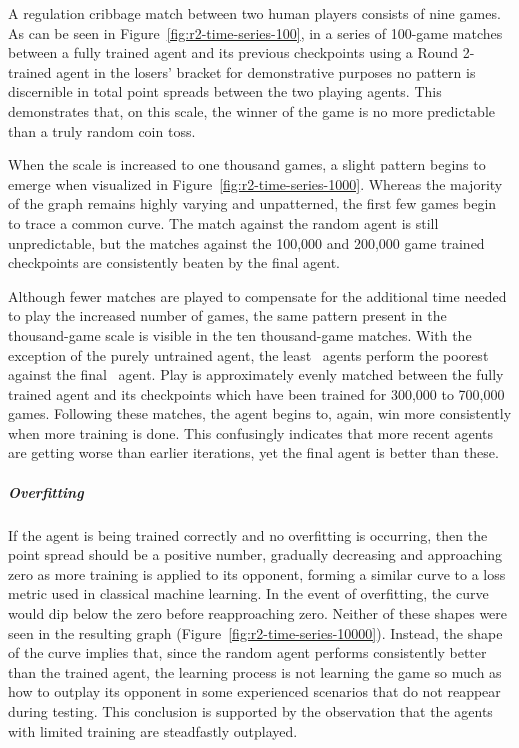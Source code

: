 A regulation cribbage match between two human players consists of nine games.
%
As can be seen in Figure~\ref{fig:r2-time-series-100},
in a series of 100-game matches between a fully trained agent and its
previous checkpoints\textemdash
using a Round 2-trained agent in the losers' bracket for demonstrative
purposes\textemdash
no pattern is discernible in total point spreads between the two playing agents.
%
This demonstrates that,
on this scale,
the winner of the game is no more predictable than a truly random coin toss.

When the scale is increased to one thousand games,
a slight pattern begins to emerge
when visualized in Figure~\ref{fig:r2-time-series-1000}.
%
Whereas the majority of the graph remains highly varying and unpatterned,
the first few games begin to trace a common curve.
%
The match against the random agent is still unpredictable,
but the matches against the 100,000 and 200,000 game trained checkpoints are
consistently beaten by the final agent.

Although fewer matches are played to compensate for the additional time needed to
play the increased number of games,
the same pattern present in the thousand-game scale is visible in the
ten thousand-game matches.
%
With the exception of the purely untrained agent,
the least \learned\ agents perform the poorest against the final
\learned\ agent.
%
Play is approximately evenly matched between the fully trained agent
and its checkpoints which have been trained for 300,000 to 700,000 games.
%
Following these matches,
the agent begins to, again, win more consistently when more training is done.
%
This confusingly indicates that more recent agents are getting worse
than earlier iterations,
yet the final agent is better than these.

\subparagraph*{Overfitting}

If the agent is being trained correctly and no overfitting is occurring,
then the point spread should be a positive number,
gradually decreasing and approaching zero
as more training is applied to its opponent,
forming a similar curve to a loss metric used in classical machine learning.
%
In the event of overfitting,
the curve would dip below the zero before reapproaching zero.
%
Neither of these shapes were seen in the resulting graph
(Figure~\ref{fig:r2-time-series-10000}).
%
Instead,
the shape of the curve implies that,
since the random agent performs consistently better than the trained agent,
the learning process is not learning the game so much as how to outplay its
opponent in some experienced scenarios that do not reappear during testing.
%
This conclusion is supported by the observation that the agents with limited
training are steadfastly outplayed.

